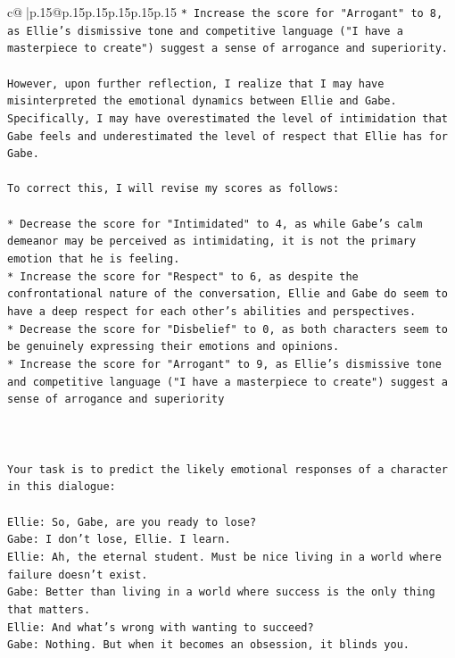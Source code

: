 \documentclass{article}
\begin{document}
{\begin{supertabular}{c@{$\;$}|p{.15\linewidth}@{}p{.15\linewidth}p{.15\linewidth}p{.15\linewidth}p{.15\linewidth}p{.15\linewidth}}
{{{\texttt{* Increase the score for "Arrogant" to 8, as Ellie's dismissive tone and competitive language ("I have a masterpiece to create") suggest a sense of arrogance and superiority.} \\
\\ 
\texttt{However, upon further reflection, I realize that I may have misinterpreted the emotional dynamics between Ellie and Gabe. Specifically, I may have overestimated the level of intimidation that Gabe feels and underestimated the level of respect that Ellie has for Gabe.} \\
\\ 
\texttt{To correct this, I will revise my scores as follows:} \\
\\ 
\texttt{* Decrease the score for "Intimidated" to 4, as while Gabe's calm demeanor may be perceived as intimidating, it is not the primary emotion that he is feeling.} \\
\texttt{* Increase the score for "Respect" to 6, as despite the confrontational nature of the conversation, Ellie and Gabe do seem to have a deep respect for each other's abilities and perspectives.} \\
\texttt{* Decrease the score for "Disbelief" to 0, as both characters seem to be genuinely expressing their emotions and opinions.} \\
\texttt{* Increase the score for "Arrogant" to 9, as Ellie's dismissive tone and competitive language ("I have a masterpiece to create") suggest a sense of arrogance and superiority} \\
\\ 
\\ 
\\ 
\texttt{Your task is to predict the likely emotional responses of a character in this dialogue:} \\
\\ 
\texttt{Ellie: So, Gabe, are you ready to lose?} \\
\texttt{Gabe: I don't lose, Ellie. I learn.} \\
\texttt{Ellie: Ah, the eternal student. Must be nice living in a world where failure doesn't exist.} \\
\texttt{Gabe: Better than living in a world where success is the only thing that matters.} \\
\texttt{Ellie: And what's wrong with wanting to succeed? } \\
\texttt{Gabe: Nothing. But when it becomes an obsession, it blinds you.} \\
}}}
\end{supertabular}}
\end{document}
